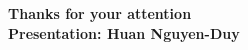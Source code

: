 \documentclass[
	11pt, %
]{beamer}
\begin{document}
\begin{frame}[plain] %
	\begin{center}
		{\Huge \textbf{Thanks for your attention}} \\
		\vspace{30px}
		{\textbf{Presentation: Huan Nguyen-Duy}}
            
	\end{center}
\end{frame}

\end{document}
